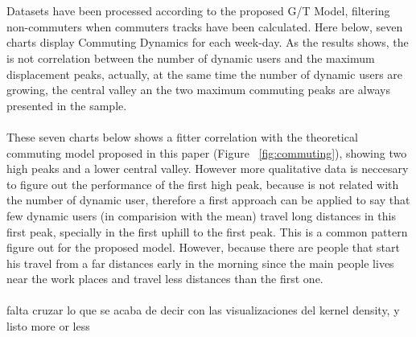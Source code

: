 \\
\\
Datasets have been processed according to the proposed G/T Model, filtering non-commuters when commuters tracks have been calculated. Here below, seven charts display Commuting Dynamics for each week-day.
As the results shows, the is not correlation between the number of dynamic users and the maximum displacement peaks, actually, at the same time the number of dynamic users are growing, the central valley an the two maximum commuting peaks are always presented in the sample.
\\
\\
These seven charts below shows a fitter correlation with the theoretical commuting model proposed in this paper (Figure ~\ref{fig:commuting}), showing two high peaks and a lower central valley. However more qualitative data is neccesary to figure out the performance of the first high peak, because is not related with the number of dynamic user, therefore a first approach can be applied to say that few dynamic users (in comparision with the mean) travel long distances in this first peak, specially in  the first uphill to the first peak. This is a common pattern figure out for the proposed model. However, because there are people that start his travel from a far distances early in the morning since the main people lives near the work places and travel less distances than the first one.  
\\
\\
 {\color{red} falta cruzar lo que se acaba de decir con las visualizaciones del kernel density, y listo more or less}


